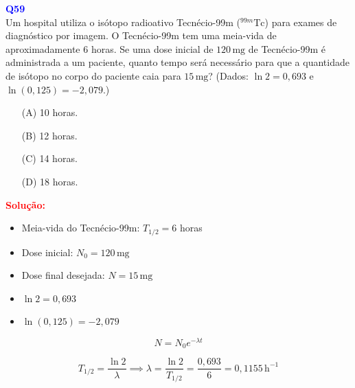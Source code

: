 \documentclass[a4paper,12pt]{article}
\begin{document}
\begin{flushleft}
\textbf{\textcolor{blue}{\Large Q59}}\\
\noindent
Um hospital utiliza o isótopo radioativo Tecnécio-99m (\(^{99m}\mathrm{Tc}\)) para exames de diagnóstico por imagem.  
O Tecnécio-99m tem uma meia-vida de aproximadamente \(6\) horas. Se uma dose inicial de \(120\,\mathrm{mg}\) de Tecnécio-99m é 
administrada a um paciente, quanto tempo será necessário para que a quantidade de isótopo no corpo do paciente caia para \(15\,\mathrm{mg}\)?
(Dados: \(\ln 2 = 0{,}693\) e \(\ln(0{,}125) = -2{,}079\).)

\begin{itemize}
\item[(A)] 10 horas.
\item[(B)] 12 horas.
\item[(C)] 14 horas.
\item[(D)] 18 horas.
\end{itemize}

\vspace{0.5cm}

\textcolor{red}{\textbf{Solução:}}\\


\begin{itemize}
    \item Meia-vida do Tecnécio-99m: \( T_{1/2} = 6 \) horas
    \item Dose inicial: \( N_0 = 120\,\mathrm{mg} \)
    \item Dose final desejada: \( N = 15\,\mathrm{mg} \)
    \item \(\ln 2 = 0{,}693\)
    \item \(\ln(0{,}125) = -2{,}079\)
\end{itemize}

\vspace{0.3cm}


\[
N = N_0 e^{-\lambda t}
\]


\vspace{0.3cm}


\[
T_{1/2} = \frac{\ln 2}{\lambda} \implies \lambda = \frac{\ln 2}{T_{1/2}} = \frac{0{,}693}{6} = 0{,}1155\,\mathrm{h}^{-1}
\]


\end{flushleft}
\end{document}
